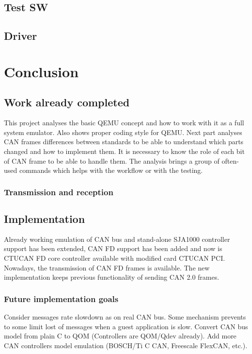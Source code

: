 \documentclass{ctuthesis}
\begin{document}
 \section{Test SW}
 
 \section{Driver}
 
\chapter{Conclusion}

 \section{Work already completed}
  This project analyses the basic QEMU concept and how to work with it as a full system emulator. Also shows proper coding style for QEMU.  Next part analyses CAN frames differences between standards to be able to understand which parts changed and how to implement them. It is necessary to know the role of each bit of CAN frame to be able to handle them. The analysis brings a group of often-used commands which helps with the workflow or with the testing.
 
 \subsection{Transmission and reception}

 \section{Implementation}
  Already working emulation of CAN bus and stand-alone SJA1000 controller support has been extended, CAN FD support has been added and now is CTUCAN FD core controller available with modified card CTUCAN PCI. Nowadays, the transmission of CAN FD frames is available. The new implementation keeps previous functionality of sending CAN 2.0 frames.

 \subsection{Future implementation goals}
  Consider messages rate slowdown as on real CAN bus. Some mechanism prevents to some limit lost of messages when a guest application is slow. Convert CAN bus model from plain C to QOM (Controllers are QOM/Qdev already). Add more CAN controllers model emulation (BOSCH/Ti C CAN, Freescale FlexCAN, etc.).
 
\end{document}
